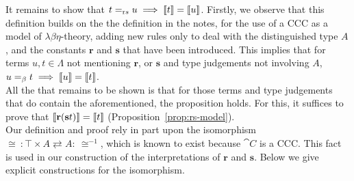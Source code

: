 \begin{prooftree}
\end{prooftree}

\begin{prooftree}
\end{prooftree}

It remains to show that ${t =_{\text rs} u\implies \sembrack{t} = \sembrack{u}}$. Firstly, we observe that this definition builds on the the definition in the notes, for the use of a CCC as a model of $\lambda\beta\eta$-theory, adding new rules only to deal with the distinguished type $A$, and the constants $\mathbf{r}$ and $\mathbf{s}$ that have been introduced. This implies that for terms ${u,t\in\Lambda}$ not mentioning $\mathbf{r}$, or $\mathbf{s}$ and type judgements not involving $A$, ${u =_\beta t \implies \sembrack{u} = \sembrack{t}}$.\\[1em]

All the that remains to be shown is that for those terms and type judgements that do contain the aforementioned, the proposition holds. For this, it suffices to prove that $\sembrack{\mathbf{r}(\mathbf{s}t)} = \sembrack{t}$ (Proposition~\ref{prop:rs-model}).\\[1em]

Our definition and proof rely in part upon the isomorphism ${\cong~:\top\times A\rightleftarrows A :~\cong^{-1}}$, which is known to exist because $\cat{C}$ is a CCC. This fact is used in our construction of the interpretations of $\mathbf{r}$ and $\mathbf{s}$. Below we give explicit constructions for the isomorphism.

